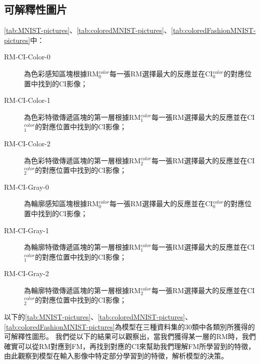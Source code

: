 \documentclass[class=NCU\_thesis, crop=false]{standalone}
\begin{document}
    \pagebreak
    \subsection{可解釋性圖片}
    \cref{tab:MNIST-pictures}、\cref{tab:coloredMNIST-pictures}、\cref{tab:coloredFashionMNIST-pictures}中：
    \begin{description}
        \item[RM-CI-Color-0] 為色彩感知區塊根據RM$^{color}_{0}$每一張RM選擇最大的反應並在CI$^{color}_{0}$的對應位置中找到的CI影像；
        \item[RM-CI-Color-1] 為色彩特徵傳遞區塊的第一層根據RM$^{color}_{1}$每一張RM選擇最大的反應並在CI$^{color}_{1}$的對應位置中找到的CI影像；
        \item[RM-CI-Color-2] 為色彩特徵傳遞區塊的第一層根據RM$^{color}_{2}$每一張RM選擇最大的反應並在CI$^{color}_{2}$的對應位置中找到的CI影像；

        \item[RM-CI-Gray-0] 為輪廓感知區塊根據RM$^{color}_{0}$每一張RM選擇最大的反應並在CI$^{color}_{0}$的對應位置中找到的CI影像；
        \item[RM-CI-Gray-1] 為輪廓特徵傳遞區塊的第一層根據RM$^{color}_{1}$每一張RM選擇最大的反應並在CI$^{color}_{1}$的對應位置中找到的CI影像；
        \item[RM-CI-Gray-2] 為輪廓特徵傳遞區塊的第一層根據RM$^{color}_{2}$每一張RM選擇最大的反應並在CI$^{color}_{2}$的對應位置中找到的CI影像；
    \end{description}
    以下的\cref{tab:MNIST-pictures}、\cref{tab:coloredMNIST-pictures}、\cref{tab:coloredFashionMNIST-pictures}為模型在三種資料集的30類中各類別所獲得的可解釋性圖形。
    我們從以下的結果可以觀察出，當我們獲得某一層的RM時，我們確實可以從RM對應到FM，再找到對應的CI來幫助我們理解FM所學習到的特徵，由此觀察到模型在輸入影像中特定部分學習到的特徵，解析模型的決策。
    \pagebreak
\end{document}
